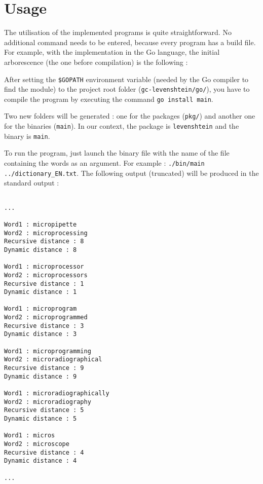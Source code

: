 \section{Usage}
\label{sec:Usage}
The utilisation of the implemented programs is quite straightforward. No additional command needs to be entered, because every program has a build file. For example, with the implementation in the Go language, the initial arborescence (the one before compilation) is the following :

\begin{figure}[H]
\end{figure}

After setting the \verb+$GOPATH+ environment variable (needed by the Go compiler to find the module) to the project root folder (\verb+gc-levenshtein/go/+), you have to compile the program by executing the command \verb+go install main+.
\par Two new folders will be generated : one for the packages (\verb+pkg/+) and another one for the binaries (\verb+main+). In our context, the package is \verb+levenshtein+ and the binary is \verb+main+.

\begin{figure}[H]
\end{figure}

To run the program, just launch the binary file with the name of the file containing the words as an argument. For example : \verb+./bin/main ../dictionary_EN.txt+. The following output (truncated) will be produced in the standard output :

\begin{lstlisting}[breaklines]

...

Word1 : micropipette
Word2 : microprocessing
Recursive distance : 8
Dynamic distance : 8

Word1 : microprocessor
Word2 : microprocessors
Recursive distance : 1
Dynamic distance : 1

Word1 : microprogram
Word2 : microprogrammed
Recursive distance : 3
Dynamic distance : 3

Word1 : microprogramming
Word2 : microradiographical
Recursive distance : 9
Dynamic distance : 9

Word1 : microradiographically
Word2 : microradiography
Recursive distance : 5
Dynamic distance : 5

Word1 : micros
Word2 : microscope
Recursive distance : 4
Dynamic distance : 4

...

\end{lstlisting}
